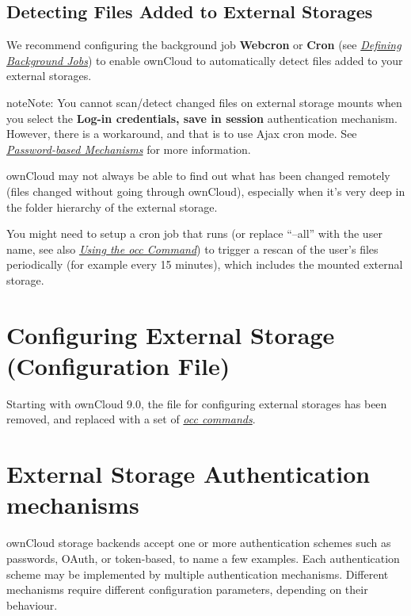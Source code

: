 \documentclass[letterpaper,10pt,english]{sphinxmanual}
\begin{document}
\subsection{Detecting Files Added to External Storages}
\label{configuration_files/external_storage_configuration_gui:detecting-files-added-to-external-storages}
We recommend configuring the background job \textbf{Webcron} or
\textbf{Cron} (see {\hyperref[configuration_server/background_jobs_configuration::doc]{\emph{\emph{Defining Background Jobs}}}})
to enable ownCloud to automatically detect files added to your external
storages.

\begin{notice}{note}{Note:}
You cannot scan/detect changed files on external storage mounts when you select
the \textbf{Log-in credentials, save in session} authentication mechanism. However, there is
a workaround, and that is to use Ajax cron mode. See {\hyperref[configuration_files/external_storage/auth_mechanisms:password\string-auth\string-workaround\string-label]{\emph{Password-based Mechanisms}}}
for more information.
\end{notice}

ownCloud may not always be able to find out what has been
changed remotely (files changed without going through ownCloud), especially
when it's very deep in the folder hierarchy of the external storage.

You might need to setup a cron job that runs 
(or replace ``--all'' with the user name, see also {\hyperref[configuration_server/occ_command::doc]{\emph{\emph{Using the occ Command}}}})
to trigger a rescan of the user's files periodically (for example every 15 minutes), which includes
the mounted external storage.


\section{Configuring External Storage (Configuration File)}
\label{configuration_files/external_storage_configuration:configuring-external-storage-configuration-file}\label{configuration_files/external_storage_configuration::doc}
Starting with ownCloud 9.0, the  file for configuring
external storages has been removed, and replaced with a set of
{\hyperref[configuration_server/occ_command:files\string-external\string-label]{\emph{occ commands}}}.


\section{External Storage Authentication mechanisms}
\label{configuration_files/external_storage/auth_mechanisms:external-storage-authentication-mechanisms}\label{configuration_files/external_storage/auth_mechanisms::doc}
ownCloud storage backends accept one or more authentication schemes such as
passwords, OAuth, or token-based, to name a few examples. Each authentication
scheme may be implemented by multiple authentication mechanisms. Different
mechanisms require different configuration parameters, depending on their
behaviour.
\end{document}

